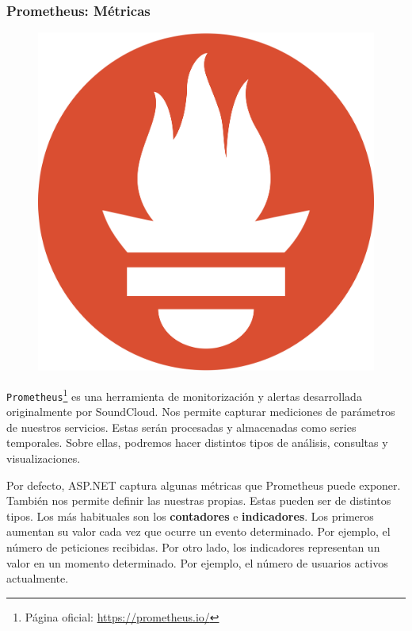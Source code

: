 \subsubsection{Prometheus: Métricas}

\begin{figure}
  \vspace{-12pt}
  \centering
  \includegraphics[scale=0.025]{cap_despliegue/images/prometheus-logo}
\end{figure}

\texttt{Prometheus}\footnote{Página oficial: \url{https://prometheus.io/}} es una herramienta de monitorización y alertas desarrollada originalmente por SoundCloud. Nos permite capturar mediciones de parámetros de nuestros servicios. Estas serán procesadas y almacenadas como series temporales. Sobre ellas, podremos hacer distintos tipos de análisis, consultas y visualizaciones.

Por defecto, ASP.NET captura algunas métricas que Prometheus puede exponer. También nos permite definir las nuestras propias. Estas pueden ser de distintos tipos. Los más habituales son los \textbf{contadores} e \textbf{indicadores}. \cite{parkerProblemDistributedTracing2020} Los primeros aumentan su valor cada vez que ocurre un evento determinado. Por ejemplo, el número de peticiones recibidas. Por otro lado, los indicadores representan un valor en un momento determinado. Por ejemplo, el número de usuarios activos actualmente.

